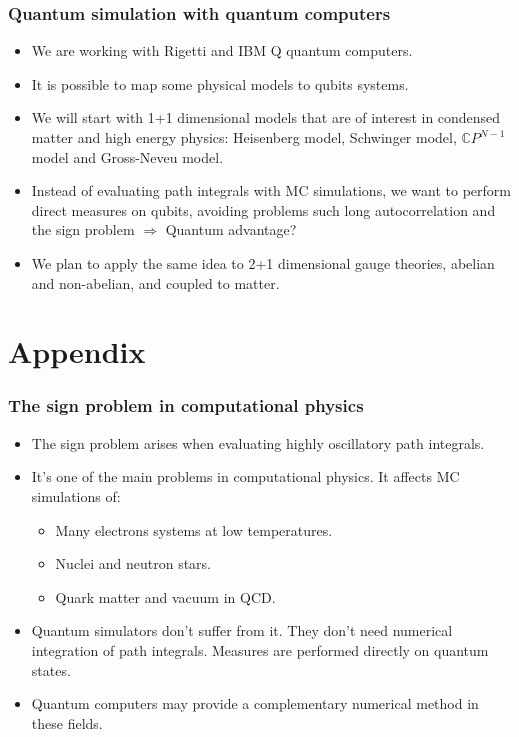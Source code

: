 \documentclass[11pt,t,xcolor=dvipsnames,aspectratio=169]{beamer}
\newlength\leftsidebar
\begin{document}
\begin{frame}
    \frametitle{Quantum simulation with quantum computers}
    \begin{itemize}
        \item
            We are working with Rigetti and IBM Q quantum computers.
        \item
            It is possible to map some physical models to qubits systems.
        \item
            We will start with 1+1 dimensional models that are of interest in condensed matter and high energy physics:
            Heisenberg model, Schwinger model, $\mathbb CP^{N-1}$ model and Gross-Neveu model.
        \item
            Instead of evaluating path integrals with MC simulations,
            we want to perform direct measures on qubits, avoiding problems such long autocorrelation and the sign problem
            $\Rightarrow$ Quantum advantage?
        \item
            We plan to apply the same idea to 2+1 dimensional gauge theories, abelian and non-abelian, and coupled to matter.
    \end{itemize}
\end{frame}


\leftsidebar
\begin{frame}[plain,t]
\titlepage
\end{frame}
\hoffset=0in %

\section{Appendix}

\begin{frame}
    \frametitle{The sign problem in computational physics}
    \begin{itemize}
        \item
            The sign problem arises when evaluating highly oscillatory path integrals.
        \item
            It's one of the main problems in computational physics.
            It affects MC simulations of:
            \begin{itemize}
                \item Many electrons systems at low temperatures.
                \item Nuclei and neutron stars.
                \item Quark matter and vacuum in QCD.
            \end{itemize}
        \item
            Quantum simulators don't suffer from it.
            They don't need numerical integration of path integrals.
            Measures are performed directly on quantum states.
        \item
            Quantum computers may provide a complementary numerical method in these fields.
    \end{itemize}
\end{frame}
\end{document}

